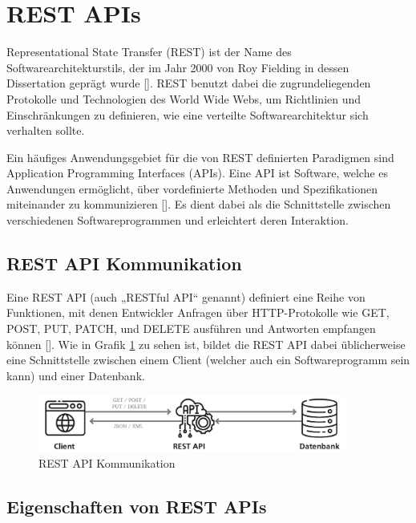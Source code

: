 \section{REST APIs}
\label{sec:rest}

Representational State Transfer (REST) ist der Name des Softwarearchitekturstils, der im Jahr 2000 von Roy Fielding in dessen Dissertation geprägt wurde [\cite{fieldingDissertation}]. REST benutzt dabei die zugrundeliegenden Protokolle und Technologien des World Wide Webs, um Richtlinien und Einschränkungen zu definieren, wie eine verteilte Softwarearchitektur sich verhalten sollte.

Ein häufiges Anwendungsgebiet für die von REST definierten Paradigmen sind Application Programming Interfaces (APIs). Eine API ist Software, welche es Anwendungen ermöglicht, über vordefinierte Methoden und Spezifikationen miteinander zu kommunizieren [\cite{restApiDesign}]. Es dient dabei als die Schnittstelle zwischen verschiedenen Softwareprogrammen und erleichtert deren Interaktion.

\subsection{REST API Kommunikation}
\label{subsec:rest_kommunikation}

Eine REST API (auch „RESTful API“ genannt) definiert eine Reihe von Funktionen, mit denen Entwickler Anfragen über HTTP-Protokolle wie GET, POST, PUT, PATCH, und DELETE ausführen und Antworten empfangen können [\cite{restWebApi}]. Wie in Grafik \ref{fig:Rest_API} zu sehen ist, bildet die REST API dabei üblicherweise eine Schnittstelle zwischen einem Client (welcher auch ein Softwareprogramm sein kann) und einer Datenbank.
%
\begin{figure}[h]
    \vspace{5mm}
	\centering\includegraphics[width=0.9\textwidth]{images/03/Rest_API.pdf}
    \caption{REST API Kommunikation}
    \label{fig:Rest_API}
\end{figure}

\subsection{Eigenschaften von REST APIs}
\label{subsec:rest_eigenschaften}

